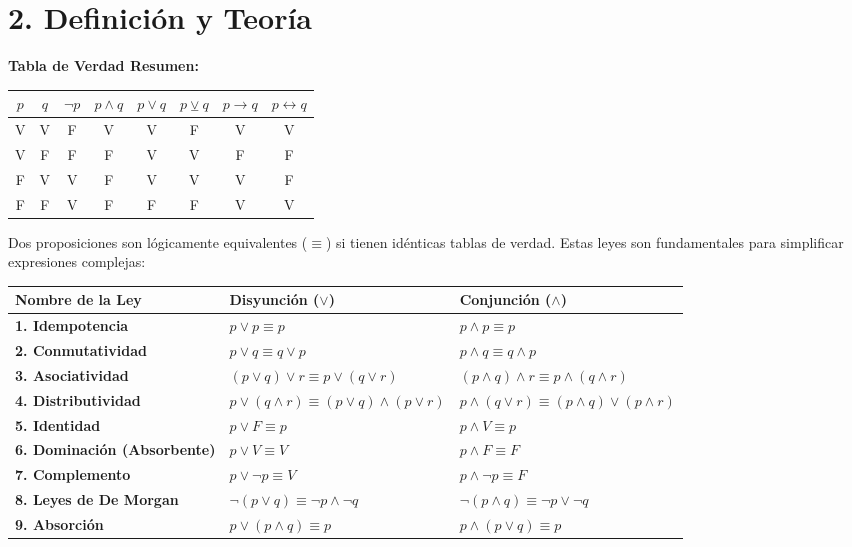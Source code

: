 \documentclass[11pt]{article}
\newenvironment{teoria}{\section*{2. Definición y Teoría}}{}
\newenvironment{definicion}[1]{\begin{tcolorbox}[colback=blue!5,colframe=blue!75!black,title=Definición: #1]}{\end{tcolorbox}}
\newenvironment{teorema}[1]{\begin{tcolorbox}[colback=green!5,colframe=green!75!black,title=Teorema: #1]}{\end{tcolorbox}}
\begin{document}
\begin{teoria}
\begin{definicion}{Conectivos Lógicos y Tablas de Verdad}
    \vspace{0.3cm}
    \textbf{Tabla de Verdad Resumen:}
    \begin{center}
      \renewcommand{\arraystretch}{1.5}
      \begin{tabular}{|c|c||c|c|c|c|c|c|}
        \hline
        $p$ & $q$ & $\neg p$ & $p \wedge q$ & $p \vee q$ & $p \veebar q$ & $p \rightarrow q$ & $p \leftrightarrow q$ \\
        \hline\hline
        V & V & F & V & V & F & V & V \\
        V & F & F & F & V & V & F & F \\
        F & V & V & F & V & V & V & F \\
        F & F & V & F & F & F & V & V \\
        \hline
      \end{tabular}
    \end{center}
  \end{definicion}

  \begin{teorema}{Leyes del Álgebra Proposicional (Equivalencias Lógicas)}
    Dos proposiciones son lógicamente equivalentes ($\equiv$) si tienen idénticas tablas de verdad. Estas leyes son fundamentales para simplificar expresiones complejas:
    
    \vspace{0.2cm}
    \begin{center}
      \renewcommand{\arraystretch}{1.5}
      \begin{tabular}{|l|l|l|}
        \hline
        \textbf{Nombre de la Ley} & \textbf{Disyunción ($\vee$)} & \textbf{Conjunción ($\wedge$)} \\
        \hline\hline
        \textbf{1. Idempotencia} & $p \vee p \equiv p$ & $p \wedge p \equiv p$ \\
        \textbf{2. Conmutatividad} & $p \vee q \equiv q \vee p$ & $p \wedge q \equiv q \wedge p$ \\
        \textbf{3. Asociatividad} & $(p \vee q) \vee r \equiv p \vee (q \vee r)$ & $(p \wedge q) \wedge r \equiv p \wedge (q \wedge r)$ \\
        \textbf{4. Distributividad} & $p \vee (q \wedge r) \equiv (p \vee q) \wedge (p \vee r)$ & $p \wedge (q \vee r) \equiv (p \wedge q) \vee (p \wedge r)$ \\
        \textbf{5. Identidad} & $p \vee F \equiv p$ & $p \wedge V \equiv p$ \\
        \textbf{6. Dominación (Absorbente)} & $p \vee V \equiv V$ & $p \wedge F \equiv F$ \\
        \textbf{7. Complemento} & $p \vee \neg p \equiv V$ & $p \wedge \neg p \equiv F$ \\
        \textbf{8. Leyes de De Morgan} & $\neg(p \vee q) \equiv \neg p \wedge \neg q$ & $\neg(p \wedge q) \equiv \neg p \vee \neg q$ \\
        \textbf{9. Absorción} & $p \vee (p \wedge q) \equiv p$ & $p \wedge (p \vee q) \equiv p$ \\
        \hline
      \end{tabular}
    \end{center}
    

\end{teorema}
\end{teoria}
\end{document}

